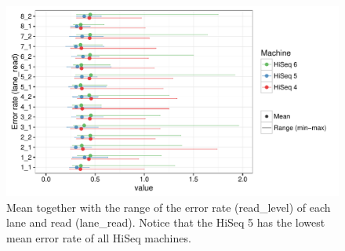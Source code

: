 \documentclass[a4paper,11pt,fleqn,twoside,notitlepage]{report}
\makeatletter
\def\maxwidth{ %
  \ifdim\Gin@nat@width>\linewidth
    \linewidth
  \else
    \Gin@nat@width
  \fi
}
\newenvironment{knitrout}{}{} %
\makeatother
\begin{document}
\begin{knitrout}
\begin{figure}[!htb]
\includegraphics[width=\maxwidth]{figure/MeanVectorFigure-1} \caption[Mean together with the range of the error rate (read\_level) of each lane and read (lane\_read)]{Mean together with the range of the error rate (read\_level) of each lane and read (lane\_read). Notice that the HiSeq 5 has the lowest mean error rate of all HiSeq machines.}\label{fig:MeanVectorFigure}
\end{figure}


\end{knitrout}
\end{document}

